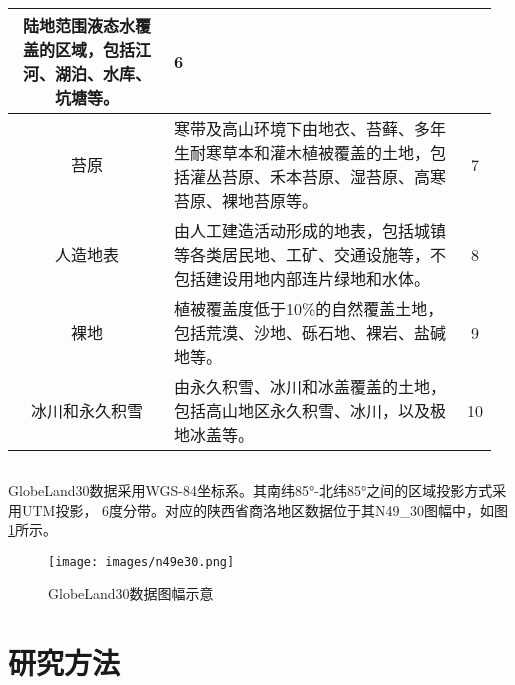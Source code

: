 \documentclass[10pt,aspectratio=169]{beamer} %
\begin{document}
\begin{frame}[c]{\secname}{\subsecname}
\begin{columns}
\begin{table}[htbp]
\begin{tabular}{c| m{24.78em}| c}
	    	\textcolor[rgb]{ .2,  .2,  .2}{陆地范围液态水覆盖的区域，包括江河、湖泊、水库、坑塘等。} &
	    	\textcolor[rgb]{ .2,  .2,  .2}{6}
	    	\\
	    	\hline
	    	\textcolor[rgb]{ .2,  .2,  .2}{苔原} &
	    	\textcolor[rgb]{ .2,  .2,  .2}{寒带及高山环境下由地衣、苔藓、多年生耐寒草本和灌木植被覆盖的土地，包括灌丛苔原、禾本苔原、湿苔原、高寒苔原、裸地苔原等。} &
	    	\textcolor[rgb]{ .2,  .2,  .2}{7}
	    	\\
	    	\hline
	    	\textcolor[rgb]{ .2,  .2,  .2}{人造地表} &
	    	\textcolor[rgb]{ .2,  .2,  .2}{由人工建造活动形成的地表，包括城镇等各类居民地、工矿、交通设施等，不包括建设用地内部连片绿地和水体。} &
	    	\textcolor[rgb]{ .2,  .2,  .2}{8}
	    	\\
	    	\hline
	    	\textcolor[rgb]{ .2,  .2,  .2}{裸地} &
	    	\textcolor[rgb]{ .2,  .2,  .2}{植被覆盖度低于10\%的自然覆盖土地，包括荒漠、沙地、砾石地、裸岩、盐碱地等。} &
	    	\textcolor[rgb]{ .2,  .2,  .2}{9}
	    	\\
	    	\hline
	    	\textcolor[rgb]{ .2,  .2,  .2}{冰川和永久积雪} &
	    	\textcolor[rgb]{ .2,  .2,  .2}{由永久积雪、冰川和冰盖覆盖的土地，包括高山地区永久积雪、冰川，以及极地冰盖等。} &
	    	\textcolor[rgb]{ .2,  .2,  .2}{10}
	    	\\
	    	\hline
	    \end{tabular}%
	\label{Table.main.1}%
\end{table}%
	\end{columns}	
	\end{frame}

	\begin{frame}[c]{\secname}{\subsecname}
		GlobeLand30数据采用WGS-84坐标系。其南纬85$°$-北纬85$°$之间的区域投影方式采用UTM投影， 6度分带。对应的陕西省商洛地区数据位于其N49\_30图幅中，如图\ref{Fig.main.2}所示。
			\begin{figure}[htbp] %
			\centering %
			\texttt{[image: images/n49e30.png]} 
			\caption{GlobeLand30数据图幅示意} %
			\label{Fig.main.2} %
		\end{figure}
	\end{frame}
	\section{研究方法}
\end{document}

